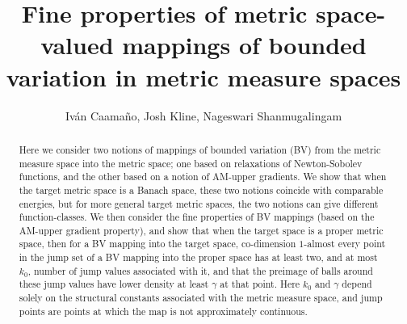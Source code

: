 \documentclass[11pt, letterpaper]{amsart} %
\numberwithin{equation}{section}
\theoremstyle{plain}
\theoremstyle{definition}
\begin{document}
\title[Fine properties of BV mappings]{Fine properties of metric space-valued mappings of bounded variation in metric measure spaces} 
\author[Caama\~{n}o, Kline, Shanmugalingam]{Iv\'an Caama\~{n}o, Josh Kline, Nageswari Shanmugalingam}
\maketitle

\begin{abstract} {Here we consider 
two notions of mappings of bounded variation (BV) from the metric measure space into the metric space; 
one based
on relaxations of Newton-Sobolev functions, and the other based on a notion of AM-upper gradients. We show that when
the target metric space is a Banach space, these two notions coincide with comparable energies, but for more general
target metric spaces, the two notions can give different function-classes. We then consider the fine properties of BV mappings
(based on the AM-upper gradient property), and show that when the target space is a proper metric space, 
then for a BV mapping into the target space, 
co-dimension $1$-almost every point in the jump set of a BV mapping into the proper space has at least two, and at most
$k_0$, number of jump values associated with it, and that the preimage of balls around these jump values have lower density
at least $\gamma$ at that point. Here $k_0$ and $\gamma$ depend solely on the 
structural constants associated with the metric measure space,
and jump points are points at which the map is not approximately
continuous.}
\end{abstract}
\end{document}
